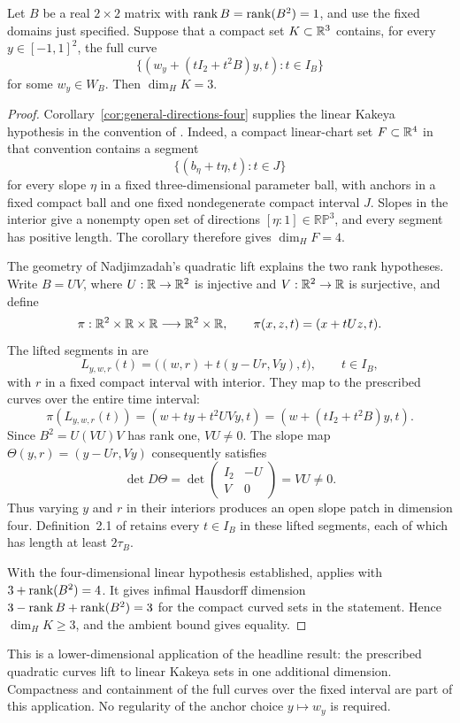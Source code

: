 \begin{corollary}
\label{cor:quadratic-curved-three}
Let \(B\) be a real \(2\times2\) matrix with
\(\operatorname{rank} B=\operatorname{rank}(B^2)=1\), and use the fixed domains just specified.
Suppose that a compact set \(K\subset\mathbb R^3\) contains, for every
\(y\in[-1,1]^2\), the full curve
\[
 \{(w_y+(tI_2+t^2B)y,t):t\in I_B\}
\]
for some \(w_y\in W_B\). Then \(\dim_H K=3\).
\end{corollary}
\begin{proof}
Corollary~\ref{cor:general-directions-four} supplies the linear Kakeya
hypothesis in the convention of
\citet[Section~1.2, equations~(1.8)--(1.13)]{NadjimzadahLifting}.
Indeed, a compact linear-chart set \(F\subset\mathbb R^4\) in that convention
contains a segment
\[
 \{(b_\eta+t\eta,t):t\in J\}
\]
for every slope \(\eta\) in a fixed three-dimensional parameter ball,
with anchors in a fixed compact ball and one fixed nondegenerate
compact interval \(J\). Slopes in the interior give a nonempty open
set of directions \([\eta:1]\in\mathbb{RP}^3\), and every segment has
positive length. The corollary therefore gives \(\dim_H F=4\).

The geometry of Nadjimzadah's quadratic lift explains the two rank
hypotheses. Write \(B=UV\), where \(U:\mathbb R\to\mathbb R^2\) is injective and
\(V:\mathbb R^2\to\mathbb R\) is surjective, and define
\[
 \pi:\mathbb R^2\times\mathbb R\times\mathbb R\longrightarrow\mathbb R^2\times\mathbb R,
 \qquad \pi(x,z,t)=(x+tUz,t).
\]
The lifted segments in
\citet[equations~(4.1)--(4.9)]{NadjimzadahLifting} are
\[
 L_{y,w,r}(t)=\bigl((w,r)+t(y-Ur,Vy),t\bigr),
 \qquad t\in I_B,
\]
with \(r\) in a fixed compact interval with interior. They map to the
prescribed curves over the entire time interval:
\[
 \pi(L_{y,w,r}(t))=(w+ty+t^2UVy,t)
                  =(w+(tI_2+t^2B)y,t).
\]
Since \(B^2=U(VU)V\) has rank one, \(VU\ne0\). The slope map
\(\Theta(y,r)=(y-Ur,Vy)\) consequently satisfies
\[
 \det D\Theta
   =\det\begin{pmatrix}I_2&-U\\ V&0\end{pmatrix}=VU\ne0.
\]
Thus varying \(y\) and \(r\) in their interiors produces an open slope
patch in dimension four. Definition~2.1 of
\citet{NadjimzadahLifting} retains every \(t\in I_B\) in these lifted
segments, each of which has length at least \(2\tau_B\).

With the four-dimensional linear hypothesis established,
\citet[Theorem~1.3]{NadjimzadahLifting} applies with
\(3+\operatorname{rank}(B^2)=4\). It gives infimal Hausdorff dimension
\(3-\operatorname{rank} B+\operatorname{rank}(B^2)=3\) for the compact curved sets in the
statement. Hence \(\dim_H K\ge3\), and the ambient bound gives equality.
\end{proof}

This is a lower-dimensional application of the headline result:
the prescribed quadratic curves lift to linear Kakeya sets in one
additional dimension. Compactness and containment of the full curves
over the fixed interval are part of this application. No regularity
of the anchor choice \(y\mapsto w_y\) is required.
